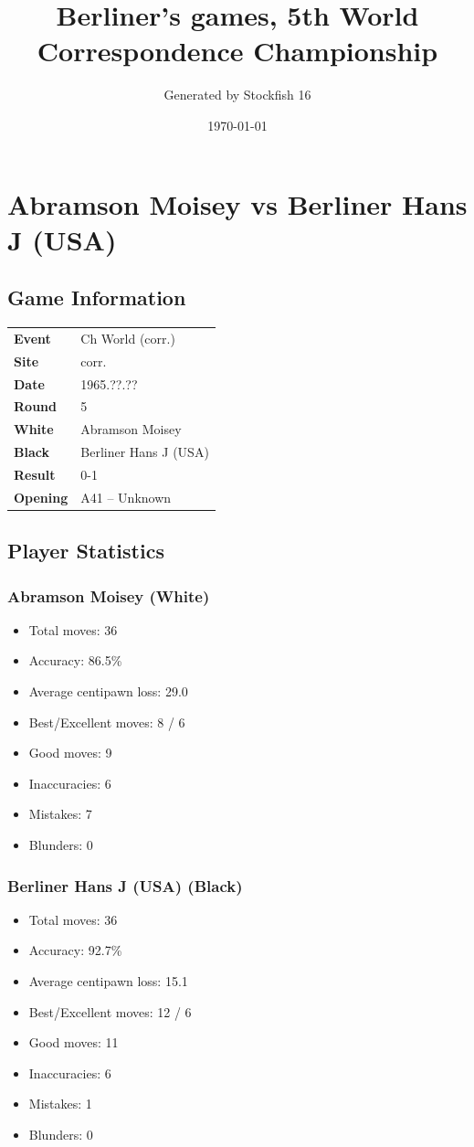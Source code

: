 \documentclass[11pt]{book}
\title{Berliner's games, 5th World Correspondence Championship}
\author{Generated by Stockfish 16}
\date{\today}
\begin{document}
\maketitle
\tableofcontents

\chapter{Abramson Moisey vs Berliner Hans J (USA)}

\section{Game Information}
\begin{tabular}{ll}
\textbf{Event} & Ch World (corr.) \\
\textbf{Site} & corr. \\
\textbf{Date} & 1965.??.?? \\
\textbf{Round} & 5 \\
\textbf{White} & Abramson Moisey \\
\textbf{Black} & Berliner Hans J (USA) \\
\textbf{Result} & 0-1 \\
\textbf{Opening} & A41 -- Unknown \\
\end{tabular}

\section{Player Statistics}

\subsection{Abramson Moisey (White)}
\begin{itemize}
\item Total moves: 36
\item Accuracy: 86.5\%
\item Average centipawn loss: 29.0
\item Best/Excellent moves: 8 / 6
\item Good moves: 9
\item Inaccuracies: 6
\item Mistakes: 7
\item Blunders: 0
\end{itemize}

\subsection{Berliner Hans J (USA) (Black)}
\begin{itemize}
\item Total moves: 36
\item Accuracy: 92.7\%
\item Average centipawn loss: 15.1
\item Best/Excellent moves: 12 / 6
\item Good moves: 11
\item Inaccuracies: 6
\item Mistakes: 1
\item Blunders: 0
\end{itemize}
\end{document}
